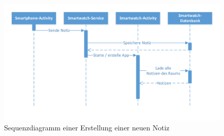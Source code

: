 \begin{figure}[H]
\centering
\includegraphics[width=1\linewidth]{../Bilder/SequenzdigrammNewNote}
\caption{Sequenzdiagramm einer Erstellung einer neuen Notiz}
\label{fig:SequenzdigrammNewNote}
\end{figure}

